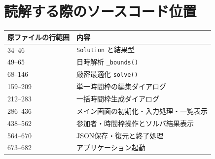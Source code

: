 \documentclass[11pt,a4paper]{ltjsarticle}
\theoremstyle{definition}
\theoremstyle{remark}
\newcommand{\code}[1]{\texttt{#1}}
\begin{document}
\section{読解する際のソースコード位置}
{\small
\begin{tabular}{@{}p{42mm}p{110mm}@{}}
\toprule
原ファイルの行範囲 & 内容 \\
\midrule
34--46 & \code{Solution} と結果型 \\
49--65 & 日時解析 \code{\_bounds()} \\
68--146 & 厳密最適化 \code{solve()} \\
159--209 & 単一時間枠の編集ダイアログ \\
212--283 & 一括時間枠生成ダイアログ \\
286--436 & メイン画面の初期化・入力処理・一覧表示 \\
438--562 & 参加者・時間枠操作とソルバ結果表示 \\
564--670 & JSON保存・復元と終了処理 \\
673--682 & アプリケーション起動 \\
\bottomrule
\end{tabular}
}
\end{document}

